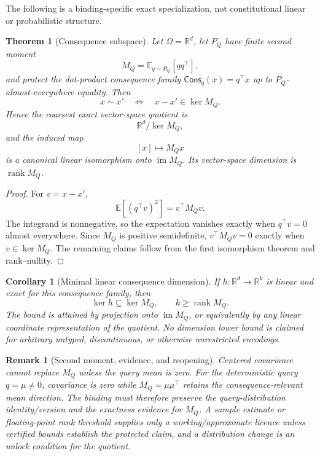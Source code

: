 \documentclass[11pt,oneside]{article}
\newtheorem{theorem}[definition]{Theorem}
\newtheorem{corollary}[definition]{Corollary}
\newtheorem{remark}[definition]{Remark}
\begin{document}
The following is a binding-specific exact specialization, not constitutional linear or
probabilistic structure.

\begin{theorem}[Consequence subspace]\label{thm:consequence-subspace}
Let \(\Omega=\mathbb R^d\), let \(P_Q\) have finite second moment
\[
M_Q=\mathbb E_{q\sim P_Q}[qq^\top],
\]
and protect the dot-product consequence family
\(\mathsf{Cons}_q(x)=q^\top x\) up to \(P_Q\)-almost-everywhere equality.  Then
\[
x\sim x'
\quad\Longleftrightarrow\quad
x-x'\in\ker M_Q.
\]
Hence the coarsest exact vector-space quotient is
\[
\boxed{\mathbb R^d/\ker M_Q,}
\]
and the induced map
\[
[x]\longmapsto M_Qx
\]
is a canonical linear isomorphism onto \(\operatorname{im}M_Q\).  Its vector-space
dimension is \(\operatorname{rank}M_Q\).
\end{theorem}

\begin{proof}
For \(v=x-x'\),
\[
\mathbb E[(q^\top v)^2]=v^\top M_Qv.
\]
The integrand is nonnegative, so the expectation vanishes exactly when
\(q^\top v=0\) almost everywhere.  Since \(M_Q\) is positive semidefinite,
\(v^\top M_Qv=0\) exactly when \(v\in\ker M_Q\).  The remaining claims follow from
the first isomorphism theorem and rank--nullity.
\end{proof}

\begin{corollary}[Minimal linear consequence dimension]
If \(h:\mathbb R^d\to\mathbb R^k\) is linear and exact for this consequence family,
then
\[
\ker h\subseteq\ker M_Q,
\qquad
k\geq\operatorname{rank}M_Q.
\]
The bound is attained by projection onto \(\operatorname{im}M_Q\), or equivalently by
any linear coordinate representation of the quotient.  No dimension lower bound is
claimed for arbitrary untyped, discontinuous, or otherwise unrestricted encodings.
\end{corollary}

\begin{remark}[Second moment, evidence, and reopening]
Centered covariance cannot replace \(M_Q\) unless the query mean is zero.  For the
deterministic query \(q=\mu\neq0\), covariance is zero while
\(M_Q=\mu\mu^\top\) retains the consequence-relevant mean direction.  The binding must
therefore preserve the query-distribution identity/version and the exactness evidence
for \(M_Q\).  A sample estimate or floating-point rank threshold supplies only a
working/approximate licence unless certified bounds establish the protected claim, and
a distribution change is an unlock condition for the quotient.
\end{remark}
\end{document}
